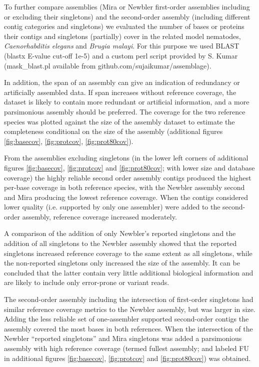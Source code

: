 \documentclass[12pt,a4paper]{article}
\begin{document}
To further compare assemblies (Mira or Newbler first-order assemblies
including or excluding their singletons) and the second-order assembly
(including different contig categories and singletons) we evaluated
the number of bases or proteins their contigs and singletons
(partially) cover in the related model nematodes,
\textit{Caenorhabditis elegans} and \textit{Brugia malayi}. For this
purpose we used BLAST (blastx E-value cut-off 1e-5) and a custom perl
script provided by S. Kumar (mask\_blast.pl available from
github.com/sujaikumar/assemblage).

In addition, the span of an assembly can give an indication of
redundancy or artificially assembled data. If span increases without
reference coverage, the dataset is likely to contain more redundant or
artificial information, and a more parsimonious assembly should be
preferred. The coverage for the two reference species was plotted
against the size of the assembly dataset to estimate the completeness
conditional on the size of the assembly (additional figures
\ref{fig:basecov}, \ref{fig:protcov}, \ref{fig:prot80cov}).

From the assemblies excluding singletons (in the lower left corners of
additional figures \ref{fig:basecov}, \ref{fig:protcov} and
\ref{fig:prot80cov}; with lower size and database coverage) the highly
reliable second order assembly contigs produced the highest per-base
coverage in both reference species, with the Newbler assembly second
and Mira producing the lowest reference coverage. When the contigs
considered lower quality (i.e. supported by only one assembler) were
added to the second-order assembly, reference coverage increased
moderately.

A comparison of the addition of only Newbler's reported singletons and
the addition of all singletons to the Newbler assembly showed that the
reported singletons increased reference coverage to the same extent as
all singletons, while the non-reported singletons only increased the
size of the assembly. It can be concluded that the latter contain very
little additional biological information and are likely to include
only error-prone or variant reads.

The second-order assembly including the intersection of first-order
singletons had similar reference coverage metrics to the Newbler
assembly, but was larger in size. Adding the less reliable set of
one-assembler supported second-order contigs the assembly covered the
most bases in both references. When the intersection of the Newbler
``reported singletons'' and Mira singletons was added a parsimonious
assembly with high reference coverage (termed fullest assembly; and
labeled FU in additional figures \ref{fig:basecov}, \ref{fig:protcov}
and \ref{fig:prot80cov}) was obtained.
\end{document}
